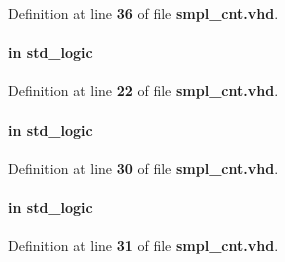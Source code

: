 Definition at line {\bf 36} of file {\bf smpl\+\_\+cnt.\+vhd}.

\paragraph[{reset\+\_\+n}]{ {\bfseries \textcolor{keywordflow}{in}\textcolor{vhdlchar}{ }} {\bfseries \textcolor{comment}{std\+\_\+logic}\textcolor{vhdlchar}{ }} \hspace{0.3cm}{\ttfamily [Port]}}\label{classsmpl__cnt_a446ea52ed8c4a84181a47d9165ce41a5}


Definition at line {\bf 22} of file {\bf smpl\+\_\+cnt.\+vhd}.

\paragraph[{sclr}]{ {\bfseries \textcolor{keywordflow}{in}\textcolor{vhdlchar}{ }} {\bfseries \textcolor{comment}{std\+\_\+logic}\textcolor{vhdlchar}{ }} \hspace{0.3cm}{\ttfamily [Port]}}\label{classsmpl__cnt_a12175d404278bb7c9a33ab7bb2552b29}


Definition at line {\bf 30} of file {\bf smpl\+\_\+cnt.\+vhd}.

\paragraph[{sload}]{ {\bfseries \textcolor{keywordflow}{in}\textcolor{vhdlchar}{ }} {\bfseries \textcolor{comment}{std\+\_\+logic}\textcolor{vhdlchar}{ }} \hspace{0.3cm}{\ttfamily [Port]}}\label{classsmpl__cnt_ae466da6a7da5cd14e469ffdccea7070e}


Definition at line {\bf 31} of file {\bf smpl\+\_\+cnt.\+vhd}.

\paragraph[{std\+\_\+logic\+\_\+1164}]{\hspace{0.3cm}{\ttfamily [Package]}}\label{classsmpl__cnt_acd03516902501cd1c7296a98e22c6fcb}


